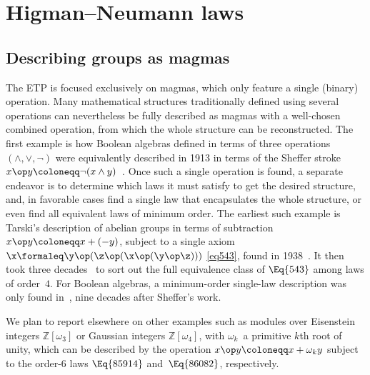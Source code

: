 \section{Higman--Neumann laws}\label{higman-neumann}

\subsection{Describing groups as magmas}

The ETP is focused exclusively on magmas, which only feature a single (binary) operation.  Many mathematical structures traditionally defined using several operations can nevertheless be fully described as magmas with a well-chosen combined operation, from which the whole structure can be reconstructed.  The first example is how Boolean algebras defined in terms of three operations $(\land,\lor,\lnot)$ were equivalently described in 1913 in terms of the Sheffer stroke $x\op y\coloneqq \lnot(x\land y)$~\cite{sheffer}.  Once such a single operation is found, a separate endeavor is to determine which laws it must satisfy to get the desired structure, and, in favorable cases find a single law that encapsulates the whole structure, or even find all equivalent laws of minimum order.  The earliest such example is Tarski's description of abelian groups in terms of subtraction $x\op y\coloneqq x+(-y)$, subject to a single axiom $\x \formaleq \y \op (\z \op (\x \op (\y \op \z)))$ \eqref{eq543}, found in 1938~\cite{Tarski1938}.  It then took three decades~\cite{higman-neumann,Sholander01021959,Padmanabhan_1969} to sort out the full equivalence class of $\Eq{543}$ among laws of order~$4$.  For Boolean algebras, a minimum-order single-law description was only found in~\cite{mccune_et_al}, nine decades after Sheffer's work.

We plan to report elsewhere on other examples such as modules over Eisenstein integers $\mathbb{Z}[\omega_3]$ or Gaussian integers $\mathbb{Z}[\omega_4]$, with $\omega_k$~a primitive $k$th root of unity, which can be described by the operation $x \op y \coloneqq x + \omega_k y$ subject to the order-$6$ laws $\Eq{85914}$ and~$\Eq{86082}$, respectively.

